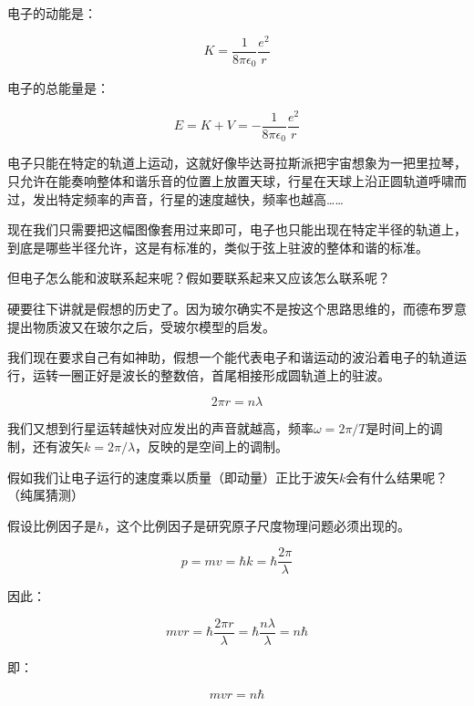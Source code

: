 电子的动能是：

\begin{equation}
K = \frac{1}{8 \pi \epsilon_0} \frac{e^2}{ r }
\end{equation}

电子的总能量是：

\begin{equation}
E = K + V = - \frac{1}{8 \pi \epsilon_0} \frac{e^2}{ r }
\end{equation}

电子只能在特定的轨道上运动，这就好像毕达哥拉斯派把宇宙想象为一把里拉琴，只允许在能奏响整体和谐乐音的位置上放置天球，行星在天球上沿正圆轨道呼啸而过，发出特定频率的声音，行星的速度越快，频率也越高……

现在我们只需要把这幅图像套用过来即可，电子也只能出现在特定半径的轨道上，到底是哪些半径允许，这是有标准的，类似于弦上驻波的整体和谐的标准。


但电子怎么能和波联系起来呢？假如要联系起来又应该怎么联系呢？

硬要往下讲就是假想的历史了。因为玻尔确实不是按这个思路思维的，而德布罗意提出物质波又在玻尔之后，受玻尔模型的启发。

我们现在要求自己有如神助，假想一个能代表电子和谐运动的波沿着电子的轨道运行，运转一圈正好是波长的整数倍，首尾相接形成圆轨道上的驻波。

\begin{equation}
2 \pi r = n \lambda
\end{equation}

我们又想到行星运转越快对应发出的声音就越高，频率$\omega = 2 \pi /T$是时间上的调制，还有波矢$k = 2 \pi / \lambda$，反映的是空间上的调制。

假如我们让电子运行的速度乘以质量（即动量）正比于波矢$k$会有什么结果呢？（纯属猜测）

假设比例因子是$\hbar$，这个比例因子是研究原子尺度物理问题必须出现的。

\begin{equation}
p = m v = \hbar k = \hbar \frac{2 \pi }{\lambda}
\end{equation}

因此：

\begin{equation*}
m v r = \hbar \frac{2 \pi r}{\lambda} = \hbar \frac{ n \lambda }{ \lambda} = n \hbar
\end{equation*}

即：

\begin{equation}
mvr = n \hbar 
\end{equation}

